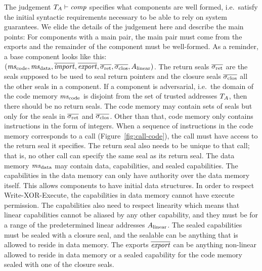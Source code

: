 \documentclass[acmsmall,screen]{acmart}\settopmatter{}
\renewcommand{\comp}{\var{comp}}
\newcommand{\wdjud}[2][ ]{#1 \vdash #2}
\begin{document}
The judgement $\wdjud[\ta]{\comp}$ specifies what components are well formed, i.e.\ satisfy the initial syntactic requirements necessary to be able to rely on system guarantees.
We elide the details of the judgement here and describe the main points:
For components with a main pair, the main pair must come from the exports and the remainder of the component must be well-formed.
As a reminder, a base component looks like this: $(\mscode,\msdata,\overline{\var{import}},\overline{\var{export}},\sigrets,\sigcloss,A_\linear)$.
The return seals $\sigrets$ are the seals supposed to be used to seal return pointers and the closure seals $\sigcloss$ all the other seals in a component.
If a component is adversarial, i.e.\ the domain of the code memory $\mscode$ is disjoint from the set of trusted addresses $T_{A}$, then there should be no return seals.
The code memory may contain sets of seals but only for the seals in $\sigrets$ and $\sigcloss$.
Other than that, code memory only contains instructions in the form of integers.
When a sequence of instructions in the code memory corresponds to a call (Figure~\ref{fig:call-code}), the call must have access to the return seal it specifies.
The return seal also needs to be unique to that call; that is, no other call can specify the same seal as its return seal.
The data memory $\msdata$ may contain data, capabilities, and sealed capabilities.
The capabilities in the data memory can only have authority over the data memory itself.
This allows components to have initial data structures.
In order to respect Write-XOR-Execute, the capabilities in data memory cannot have execute permission.
The capabilities also need to respect linearity which means that linear capabilities cannot be aliased by any other capability, and they must be for a range of the predetermined linear addresses $A_{\mathrm{linear}}$.
The sealed capabilities must be sealed with a closure seal, and the sealable can be anything that is allowed to reside in data memory.
The exports $\overline{\mathit{export}}$ can be anything non-linear allowed to reside in data memory or a sealed capability for the code memory sealed with one of the closure seals.
\end{document}

